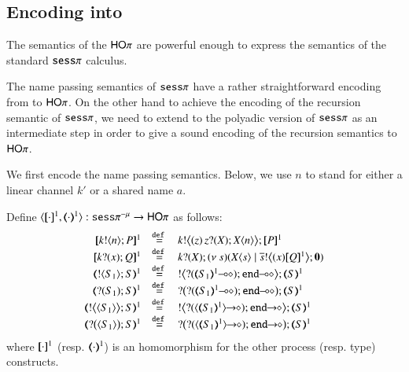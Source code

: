 \subsection{Encoding \sespnr  into \HOp}

The semantics of the $\mathsf{HO}\pi$ are powerful enough to
express the semantics of the standard $\mathtt{sess}\pi$ calculus.

The name passing semantics of $\mathtt{sess}\pi$ have a rather straightforward
encoding from to $\mathsf{HO}\pi$.
On the other hand to achieve the encoding of the recursion semantic
of $\mathtt{sess}\pi$, we need to extend
to the polyadic version of $\mathtt{sess}\pi$ as an intermediate step in order
to give a sound encoding of the recursion semantics to $\mathsf{HO}\pi$.

We first encode the name passing semantics. Below, we use $n$ to stand for either a linear channel $k'$ or a shared name $a$.

\begin{definition}
    Define $\encod{\cdot}{\cdot}{1}: \sespnr \to \HOp$  as follows:
\[
	\begin{array}{rcl}
		\pmap{\bout{k}{n} P}{1}	&\defeq&	\bbout{k}{ \abs{z}{\,\binp{z}{X} \appl{X}{n}} } \pmap{P}{1} \\
		\pmap{\binp{k}{x} Q}{1}	&\defeq&	\binp{k}{X} \newsp{s}{\appl{X}{s} \Par \bbout{\dual{s}}{\abs{x} \pmap{Q}{1}} \inact} \\
		\tmap{\btout{S_1} {S} }{1}	&\defeq&	\bbtout{\lhot{\btinp{\lhot{\tmap{S_1}{1}}}\tinact}} \tmap{S}{1}  \\
		\tmap{\btinp{S_1} S }{1}	&\defeq&	\bbtinp{\lhot{\btinp{\lhot{\tmap{S_1}{1}}}\tinact}} \tmap{S}{1} \\
		\tmap{\bbtout{\chtype{S_1}} {S} }{1}	&\defeq&	\bbtout{\shot{\btinp{\shot{\chtype{\tmap{S_1}{1}}}}\tinact}} \tmap{S}{1}  \\
		\tmap{\bbtinp{\chtype{S_1}} {S} }{1}	&\defeq&	\bbtinp{\shot{\btinp{\shot{\chtype{\tmap{S_1}{1}}}}\tinact}} \tmap{S}{1} 
	\end{array}
\]
where $[\!\![\cdot]\!\!]^1$ (resp. $(\!\!\langle\cdot\rangle\!\!)^1$) is an 
homomorphism for the other process (resp. type) constructs.
\end{definition}

